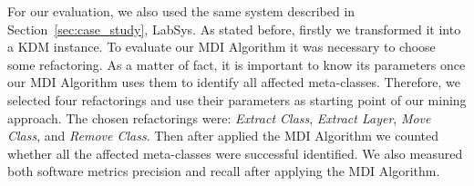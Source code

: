 For our evaluation, we also used the same system described in Section~\ref{sec:case_study}, LabSys. As stated before, firstly we transformed it into a KDM instance. %
%
%
%
%
To evaluate our MDI Algorithm it was necessary to choose some refactoring. As a matter of fact, it is important to know its parameters once our MDI Algorithm uses them to identify all affected meta-classes. Therefore, we selected four refactorings and use their parameters as starting point of our mining approach. The chosen refactorings were: \textit{Extract Class}, \textit{Extract Layer}, \textit{Move Class}, and \textit{Remove Class}. %
%
%
%
Then after applied the MDI Algorithm we counted whether all the affected meta-classes were successful identified.%
We also measured both software metrics precision and recall after applying the MDI Algorithm.


